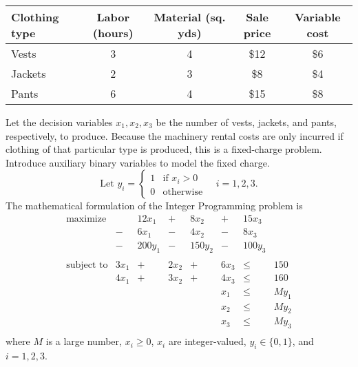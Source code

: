 \begin{enumerate}
\vspace{.1in}
\begin{tabulary}{4.5in}{LCCCC}
Clothing type
& Labor (hours) 
& Material (sq. yds) 
& Sale price 
& Variable cost \\ \hline
Vests   & 3 & 4 & \$12 & \$6 \\
Jackets & 2 & 3 & \$8 & \$4 \\
Pants   & 6 & 4 & \$15 & \$8
\end{tabulary}
\vspace{.1in}

\begin{solution}
  \bs
Let the decision variables $x_1,x_2,x_3$ be the number of vests, jackets, and 
pants, respectively, to produce. Because the machinery rental costs are only
incurred if clothing of that particular type is produced, this is a fixed-charge
problem. Introduce auxiliary binary variables to model the fixed charge.
\[
\text{Let $y_i$} = 
\begin{cases}
1 & \text{if $x_i > 0$} \\
0 & \text{otherwise}
\end{cases}
\quad i = 1,2,3.
\]
The mathematical formulation of the Integer Programming problem is
\[
\begin{array}{lrrrrrrl}
\textrm{maximize} &   & 12x_1 & + & 8x_2 & + & 15x_3 & \\
                  & - & 6x_1  & - & 4x_2 & - & 8x_3  & \\
                  & - & 200y_1& - & 150y_2&- & 100y_3& \\
& & & & & & &\\
\textrm{subject to} & 3x_1 & + & 2x_2 & + & 6x_3 & \leq & 150 \\
                    & 4x_1 & + & 3x_2 & + & 4x_3 & \leq & 160 \\
& & & & & x_1 & \leq & My_1 \\
& & & & & x_2 & \leq & My_2 \\
& & & & & x_3 & \leq & My_3 \\
\end{array}
\]
where $M$ is a large number, $x_i \geq 0$, $x_i$ are integer-valued, 
$y_i \in \{0,1\}$, and $i = 1,2,3$.
\end{solution}

\end{enumerate}

